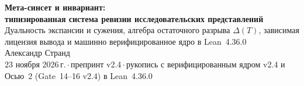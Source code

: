 \documentclass[11pt,a4paper]{article}
\theoremstyle{preprintthm}
\theoremstyle{preprintdef}
\begin{document}
\thispagestyle{plain}
\begin{center}
  {\LARGE\bfseries Мета-синсет и инвариант:\\[4pt]
  типизированная система ревизии исследовательских представлений}\\[10pt]
  {\large\color{muted} Дуальность экспансии и сужения, алгебра остаточного разрыва $\Delta(T)$, зависимая лицензия вывода и машинно верифицированное ядро в Lean~4.36.0}\\[12pt]
  {\normalsize Александр Странд}\\[4pt]
  {\small\color{muted} 23 ноября 2026\,г.\,$\cdot$\,препринт v2.4\,$\cdot$\,рукопись с верифицированным ядром v2.4 и Осью~2 (Gate~14--16 v2.4) в Lean~4.36.0}
\end{center}

\vspace{4pt}
\end{document}
